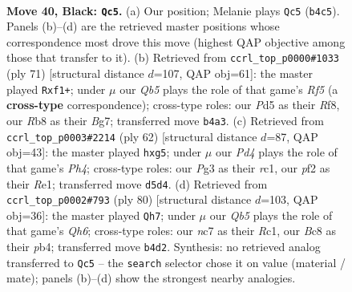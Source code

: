 \documentclass[11pt]{article}
\begin{document}
\clearpage

\begin{figure}[p]\centering
\begin{subfigure}{0.46\textwidth}\centering
\resizebox{\linewidth}{!}{%
\newchessgame
\chessboard[
  setfen={1rb2r2/p1N2p1k/1pB2Bp1/3p4/1q5P/1P4p1/R1PNQP2/R5K1 b - - 0 40},
  showmover=false,
  pgfstyle=straightmove, color=movearrow, markmove={b4-c5}
]}
\caption{}
\end{subfigure}\hfill
\begin{subfigure}{0.46\textwidth}\centering
\resizebox{\linewidth}{!}{%
\newchessgame
\chessboard[
  setfen={5r2/6bk/1B1p2q1/P2Pp3/1p3r2/1P4pp/R2NQ1PP/5R1K b - - 0 36},
  showmover=false,
  pgfstyle=straightmove, color=movearrow, markmove={f4-f1}
]}
\caption{}
\end{subfigure}
\\[4pt]
\begin{subfigure}{0.46\textwidth}\centering
\resizebox{\linewidth}{!}{%
\newchessgame
\chessboard[
  setfen={2r3k1/5p2/3p3p/pQ2b1pq/4P2P/4R1P1/PP3P2/2r1RBK1 w - - 0 32},
  showmover=false,
  pgfstyle=straightmove, color=movearrow, markmove={h4-g5}
]}
\caption{}
\end{subfigure}\hfill
\begin{subfigure}{0.46\textwidth}\centering
\resizebox{\linewidth}{!}{%
\newchessgame
\chessboard[
  setfen={k5r1/P7/2p3nQ/1qBbpp2/1p1P3p/5P2/3R1KP1/2R5 w - - 0 41},
  showmover=false,
  pgfstyle=straightmove, color=movearrow, markmove={h6-h7}
]}
\caption{}
\end{subfigure}
\caption{\textbf{Move 40, Black: \texttt{Qc5}.} (a) Our position; Melanie plays \texttt{Qc5} (\texttt{b4c5}). Panels (b)--(d) are the retrieved master positions whose correspondence most drove this move (highest QAP objective among those that transfer to it). (b) Retrieved from \texttt{ccrl\_top\_p0000\#1033} (ply 71) [structural distance $d$=107, QAP obj=61]: the master played \texttt{Rxf1+}; under $\mu$ our \emph{Qb5} plays the role of that game's \emph{Rf5} (a \textbf{cross-type} correspondence); cross-type roles: our \emph{P}d5 as their \emph{R}f8, our \emph{R}b8 as their \emph{B}g7; transferred move \texttt{b4a3}. (c) Retrieved from \texttt{ccrl\_top\_p0003\#2214} (ply 62) [structural distance $d$=87, QAP obj=43]: the master played \texttt{hxg5}; under $\mu$ our \emph{Pd4} plays the role of that game's \emph{Ph4}; cross-type roles: our \emph{P}g3 as their \emph{r}c1, our \emph{p}f2 as their \emph{R}e1; transferred move \texttt{d5d4}. (d) Retrieved from \texttt{ccrl\_top\_p0002\#793} (ply 80) [structural distance $d$=103, QAP obj=36]: the master played \texttt{Qh7}; under $\mu$ our \emph{Qb5} plays the role of that game's \emph{Qh6}; cross-type roles: our \emph{n}c7 as their \emph{R}c1, our \emph{B}c8 as their \emph{p}b4; transferred move \texttt{b4d2}. Synthesis: no retrieved analog transferred to \texttt{Qc5} -- the \texttt{search} selector chose it on value (material / mate); panels (b)--(d) show the strongest nearby analogies.}
\label{fig:thought-m79}
\end{figure}
\end{document}
